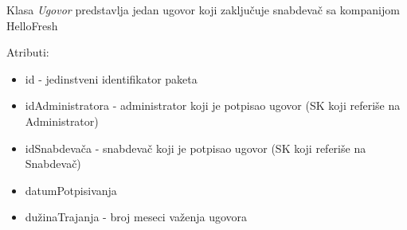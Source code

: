 Klasa \textit{Ugovor} predstavlja jedan ugovor koji zaključuje snabdevač sa kompanijom HelloFresh

Atributi:
\begin{itemize}
    \item id - jedinstveni identifikator paketa
    \item idAdministratora - administrator koji je potpisao ugovor (SK koji referiše na Administrator)
    \item idSnabdevača - snabdevač koji je potpisao ugovor (SK koji referiše na Snabdevač)
    \item datumPotpisivanja
    \item dužinaTrajanja - broj meseci važenja ugovora
\end{itemize}
